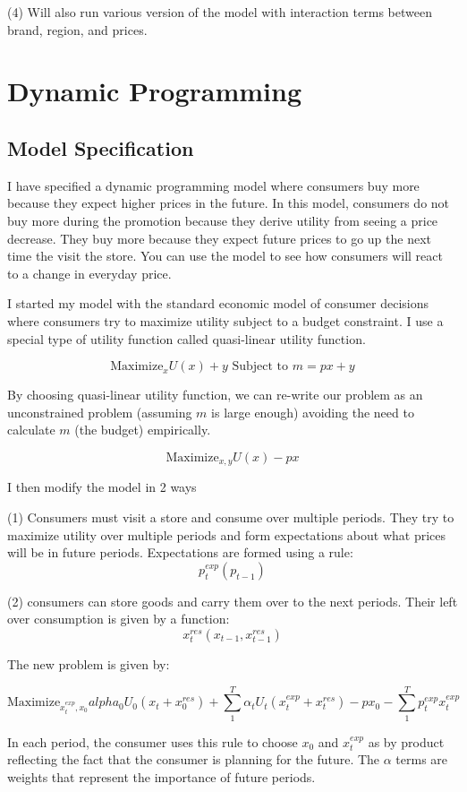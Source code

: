 \documentclass{article}
\begin{document}
(4) Will also run various version of the model with interaction terms between brand, region, and prices.

\section{Dynamic Programming}

\subsection{Model Specification}

I have specified a dynamic programming model where consumers buy more because they expect higher prices in the future. In this model, consumers do not buy more during the promotion because they derive utility from seeing a price decrease. They buy more because they expect future prices to go up the next time the visit the store. You can use the model to see how consumers will react to a change in everyday price.

I started my model with the standard economic model of consumer decisions where consumers try to maximize utility subject to a budget constraint. I use a special type of utility function called quasi-linear utility function.

$$\text{Maximize}_{x} U(x) + y  \text{ Subject to } m = px + y $$

By choosing quasi-linear utility function, we can re-write our problem as an unconstrained problem (assuming $m$ is large enough) avoiding the need to calculate $m$ (the budget) empirically. 

$$\text{Maximize}_{x,y} U(x) -px $$

I then modify the model in 2 ways

(1) Consumers must visit a store and consume over multiple periods. They try to maximize utility over multiple periods and form expectations about what prices will be in future periods. Expectations are formed using a rule: $$p^{exp}_t(p_{t-1})$$

(2) consumers can store goods and carry them over to the next periods. Their left over consumption is given by a function: $$x^{res}_t(x_{t-1},x^{res}_{t-1})$$

The new problem is given by:

$$ \text{Maximize}_{x^{exp}_t,x_0} alpha_0 U_0(x_t +x^{res}_0) + \sum_1^T \alpha_t U_t(x^{exp}_t+x^{res}_{t}) - px_0 - \sum_1^T p^{exp}_t x^{exp}_t $$

In each period, the consumer uses this rule to choose $x_0$ and $x^{exp}_t$ as by product reflecting the fact that the consumer is planning for the future. The $\alpha$ terms are weights that represent the importance of future periods.
\end{document}
